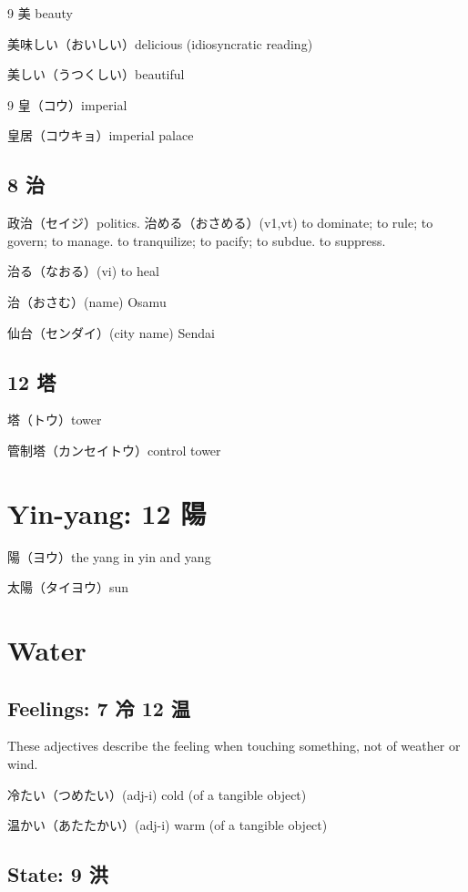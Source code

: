 9 美 beauty

美味しい（おいしい）delicious (idiosyncratic reading)

美しい（うつくしい）beautiful

9 皇（コウ）imperial

皇居（コウキョ）imperial palace

\subsection{8 治}

政治（セイジ）politics.
治める（おさめる）(v1,vt)
to dominate; to rule; to govern; to manage.
to tranquilize; to pacify; to subdue.
to suppress.

治る（なおる）(vi) to heal

治（おさむ）(name) Osamu

仙台（センダイ）(city name) Sendai

\subsection{12 塔}

塔（トウ）tower

管制塔（カンセイトウ）control tower

\section{Yin-yang: 12 陽}

陽（ヨウ）the yang in yin and yang

太陽（タイヨウ）sun

\section{Water}

\subsection{Feelings: 7 冷 12 温}

These adjectives describe the feeling when
touching something, not of weather or wind.

冷たい（つめたい）(adj-i) cold (of a tangible object)

温かい（あたたかい）(adj-i) warm (of a tangible object)

\subsection{State: 9 洪}

